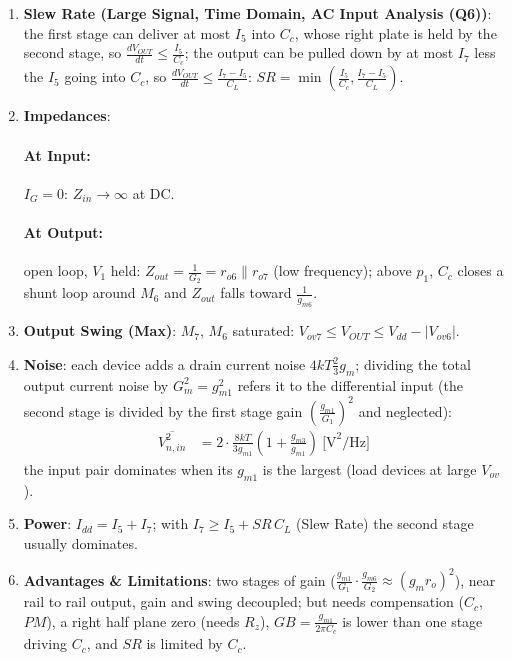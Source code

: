\begin{enumerate}
\begin{align*}
    \end{align*}
  \item \textbf{Slew Rate (Large Signal, Time Domain, AC Input Analysis (Q6))}:
    the first stage can deliver at most \(I_5\) into \(C_c\), whose right plate is
    held by the second stage, so \(\frac{dV_{OUT}}{dt} \leq \frac{I_5}{C_c}\); the output
    can be pulled down by at most \(I_7\) less the \(I_5\) going into \(C_c\), so
    \(\frac{dV_{OUT}}{dt} \leq \frac{I_7 - I_5}{C_L}\):
    \(SR = \min\left(\frac{I_5}{C_c}, \frac{I_7 - I_5}{C_L}\right)\).
  \item \textbf{Impedances}:
    \paragraph{At Input:} \(I_G = 0\): \(Z_{in} \to \infty\) at DC.
    \paragraph{At Output:} open loop, \(V_1\) held: \(Z_{out} = \frac{1}{G_2} = r_{o6} \parallel r_{o7}\) (low frequency);
    above \(p_1\), \(C_c\) closes a shunt loop around \(M_6\) and \(Z_{out}\) falls toward \(\frac{1}{g_{m6}}\).
  \item \textbf{Output Swing (Max)}: \(M_7\), \(M_6\) saturated: \(V_{ov7} \leq V_{OUT} \leq V_{dd} - |V_{ov6}|\).
  \item \textbf{Noise}: each device adds a drain current noise \(4kT\frac{2}{3}g_m\); dividing the total output
    current noise by \(G_m^2 = g_{m1}^2\) refers it to the differential input (the second stage is divided by the first stage gain \(\left(\frac{g_{m1}}{G_1}\right)^2\) and neglected):
    \begin{align*}
      \overline{V_{n,in}^2} &= 2\cdot\frac{8kT}{3 g_{m1}}\left(1 + \frac{g_{m3}}{g_{m1}}\right) \ \text{[V}^2\text{/Hz]}
    \end{align*}
    the input pair dominates when its \(g_{m1}\) is the largest (load devices at large \(V_{ov}\)).
  \item \textbf{Power}: \(I_{dd} = I_5 + I_7\); with \(I_7 \geq I_5 + SR\,C_L\) (Slew Rate) the second stage usually dominates.
  \item \textbf{Advantages \& Limitations}: two stages of gain
    (\(\frac{g_{m1}}{G_1}\cdot\frac{g_{m6}}{G_2} \approx (g_m r_o)^2\)), near rail to rail output, gain and
    swing decoupled; but needs compensation (\(C_c\), \(PM\)), a right half plane zero (needs
    \(R_z\)), \(GB = \frac{g_{m1}}{2\pi C_c}\) is lower than one stage driving \(C_c\), and \(SR\) is
    limited by \(C_c\).
\end{enumerate}

